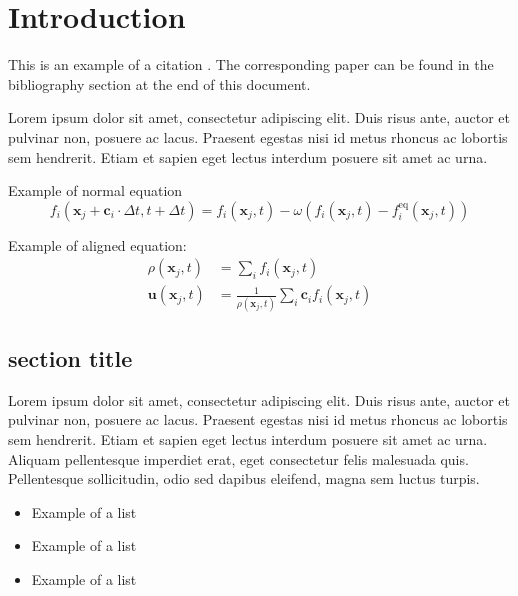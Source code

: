 \chapter{Introduction}

This is an example of a citation \cite{timm2016lattice}. The corresponding paper can be found in the bibliography section at the end of this document.

Lorem ipsum dolor sit amet, consectetur adipiscing elit. Duis risus ante, auctor et pulvinar non, posuere ac lacus. Praesent egestas nisi id metus rhoncus ac lobortis sem hendrerit. Etiam et sapien eget lectus interdum posuere sit amet ac urna.

Example of normal equation
\begin{equation}\label{eq:LBE}
f_i(\mathbf{x}_j+\mathbf{c}_i\cdot\Delta t,t+\Delta t)=f_i(\mathbf{x}_j,t)
-\omega \left( f_i(\mathbf{x}_j,t)-f_i^\text{eq}(\mathbf{x}_j,t) \right)
\end{equation}

Example of aligned equation:
\begin{align}
  \rho(\mathbf{x}_j, t) &= \sum_i f_i(\mathbf{x}_j, t) \\
  \mathbf{u}(\mathbf{x}_j, t) &= \frac{1}{ \rho(\mathbf{x}_j, t)}
    \sum_i \mathbf{c}_i f_i(\mathbf{x}_j, t)
\end{align}

\section{section title}
Lorem ipsum dolor sit amet, consectetur adipiscing elit. Duis risus ante, auctor et pulvinar non, posuere ac lacus. Praesent egestas nisi id metus rhoncus ac lobortis sem hendrerit. Etiam et sapien eget lectus interdum posuere sit amet ac urna. Aliquam pellentesque imperdiet erat, eget consectetur felis malesuada quis. Pellentesque sollicitudin, odio sed dapibus eleifend, magna sem luctus turpis.

\begin{itemize}
  \item Example of a list
  \item Example of a list
  \item Example of a list
\end{itemize}

